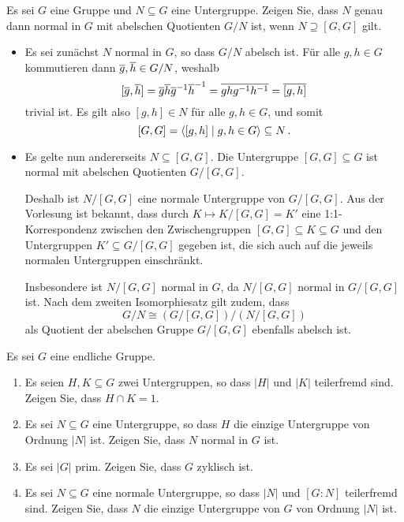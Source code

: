 \begin{question}[subtitle = Abelsche Quotienten]
  Es sei $G$ eine Gruppe und $N \subseteq G$ eine Untergruppe.
  Zeigen Sie, dass $N$ genau dann normal in $G$ mit abelschen Quotienten $G/N$ ist, wenn $N \supseteq [G,G]$ gilt.
\end{question}


\begin{solution}
  \begin{itemize}
    \item
      Es sei zunächst $N$ normal in $G$, so dass $G/N$ abelsch ist.
      Für alle $g, h \in G$ kommutieren dann $\overline{g}, \overline{h} \in G/N$, weshalb
      \[
          [\overline{g}, \overline{h}]
        = \overline{g} \overline{h} \overline{g}^{-1} \overline{h}^{-1}
        = \overline{g h g^{-1} h^{-1}}
        = \overline{[g,h]}
      \]
      trivial ist.
      Es gilt also $[g,h] \in N$ für alle $g, h \in G$, und somit
      \[
                  [G,G]
        =         \langle [g,h] \mid g, h \in G \rangle
        \subseteq N \,.
      \]
    \item
      Es gelte nun andererseits $N \subseteq [G,G]$.
      Die Untergruppe $[G,G] \subseteq G$ ist normal mit abelschen Quotienten $G/[G,G]$.
      
      Deshalb ist $N/[G,G]$ eine normale Untergruppe von $G/[G,G]$.
      Aus der Vorlesung ist bekannt, dass durch $K \mapsto K/[G,G] = K'$ eine 1:1-Korrespondenz zwischen den Zwischengruppen $[G,G] \subseteq K \subseteq G$ und den Untergruppen $K' \subseteq G/[G,G]$ gegeben ist, die sich auch auf die jeweils normalen Untergruppen einschränkt.
      
      Insbesondere ist $N/[G,G]$ normal in $G$, da $N/[G,G]$ normal in $G/[G,G]$ ist.
      Nach dem zweiten Isomorphiesatz gilt zudem, dass
      \[
              G/N
        \cong (G/[G,G])/(N/[G,G])
      \]
      als Quotient der abelschen Gruppe $G/[G,G]$ ebenfalls abelsch ist.
  \end{itemize}
\end{solution}


\begin{question}[subtitle = Zur Ordnung]
  \label{question: basic calculatings with orders}
  Es sei $G$ eine endliche Gruppe.
  \begin{enumerate}
    \item
      Es seien $H, K \subseteq G$ zwei Untergruppen, so dass $|H|$ und $|K|$ teilerfremd sind.
      Zeigen Sie, dass $H \cap K = 1$.
    \item
      Es sei $N \subseteq G$ eine Untergruppe, so dass $H$ die einzige Untergruppe von Ordnung $|N|$ ist.
      Zeigen Sie, dass $N$ normal in $G$ ist.
    \item
      Es sei $|G|$ prim.
      Zeigen Sie, dass $G$ zyklisch ist.
    \item
      Es sei $N \subseteq G$ eine normale Untergruppe, so dass $|N|$ und $[G : N]$ teilerfremd sind.
      Zeigen Sie, dass $N$ die einzige Untergruppe von $G$ von Ordnung $|N|$ ist.
  \end{enumerate}
\end{question}


